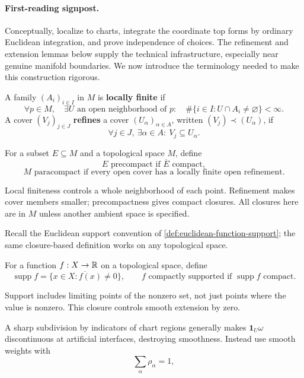 \paragraph{First-reading signpost.}
Conceptually, localize to charts, integrate the coordinate top forms by
ordinary Euclidean integration, and prove independence of choices.
The refinement and extension lemmas below supply the technical
infrastructure, especially near genuine manifold boundaries. We now
introduce the terminology needed to make this construction rigorous.

\begin{definition}\label{def:localization-covers}
A family $(A_i)_{i\in I}$ in $M$ is \textbf{locally finite} if
\[
\forall p\in M,\quad\exists U\text{ an open neighborhood of }p:\quad
\#\{i\in I:U\cap A_i\ne\varnothing\}<\infty.
\]
A cover $(V_j)_{j\in J}$ \textbf{refines} a cover $(U_\alpha)_{\alpha\in A}$,
written $(V_j)\prec(U_\alpha)$, if
\[
\forall j\in J,\ \exists\alpha\in A:\ V_j\subseteq U_\alpha.
\]
\end{definition}
\begin{definition}\label{def:precompact-paracompact}
For a subset $E\subseteq M$ and a topological space $M$, define
\[
E\text{ precompact}\text{ if }\overline E\text{ compact},
\]
\[
M\text{ paracompact}\text{ if }
\text{every open cover has a locally finite open refinement}.
\]
\end{definition}
Local finiteness controls a whole neighborhood of each point. Refinement
makes cover members smaller; precompactness gives compact closures. All
closures here are in $M$ unless another ambient space is specified.

Recall the Euclidean support convention of
\cref{def:euclidean-function-support}; the same closure-based definition
works on any topological space.
\begin{definition}[Support]\label{def:function-support}
For a function $f:X\to\mathbb{R}$ on a topological space, define
\[
\operatorname{supp}f=\overline{\{x\in X:f(x)\ne0\}},\qquad
f\text{ compactly supported}\text{ if }\operatorname{supp}f\text{ compact}.
\]
\end{definition}
Support includes limiting points of the nonzero set, not just points where
the value is nonzero. This closure controls smooth extension by zero.

A sharp subdivision by indicators of chart regions generally makes
$\mathbf1_U\omega$ discontinuous at artificial interfaces, destroying
smoothness. Instead use smooth weights with
\[
\sum_\alpha\rho_\alpha=1,
\]

